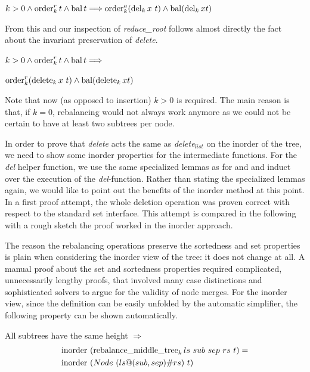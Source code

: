 \begin{lemma}
    $k > 0 \wedge \operatorname{order}^r_k t \wedge \operatorname{bal} t \Longrightarrow
    \operatorname{order}^a_k (\operatorname{del}_k x\ t) \wedge \operatorname{bal} (\operatorname{del}_k x t)$
\end{lemma}

From this and our inspection of \textit{reduce\_root}
follows almost directly the fact about the invariant
preservation of \textit{delete}.

\begin{samepage}
\begin{theorem}
    $k > 0 \wedge \operatorname{order}^r_k t \wedge \operatorname{bal} t \Longrightarrow$ \\
    \begin{center}
    $\operatorname{order}^r_k (\operatorname{delete}_k x\ t) \wedge \operatorname{bal} (\operatorname{delete}_k x t)$
    \end{center}
\end{theorem}
\end{samepage}

Note that now (as opposed to insertion) $k > 0$ is required.
The main reason is that,
if $k = 0$, rebalancing would not always work anymore
as we could not be certain to have at least two subtrees per node.

In order to prove that \textit{delete} acts the same as
\textit{delete}$_{list}$ on the inorder of the tree,
we need to show some inorder properties for the intermediate functions.
For the \textit{del} helper function, 
we use the same specialized lemmas
as for  and 
and induct over the execution of the \textit{del}-function.
Rather than stating the specialized lemmas again, we would like to point
out the benefits of the inorder method at this point.
In a first proof attempt, the whole deletion operation was
proven correct with respect to the standard set interface.
This attempt is compared in the following with a rough sketch
the proof worked in the inorder approach.

The reason the rebalancing operations preserve the sortedness and set properties
is plain when considering the inorder view of the tree:
it does not change at all.
A manual proof about the set and sortedness properties
required complicated, unnecessarily lengthy proofs,
that involved many case distinctions and sophisticated solvers
to argue for the validity of node merges.
For the inorder view, 
since the definition can be easily unfolded
by the automatic simplifier,
the following property can be shown automatically.

\begin{lemma}
    \label{lem:rebalance-inorder}
    All subtrees have the same height $\Longrightarrow$ \\
    \begin{align*}
    \operatorname{inorder}&\ (\operatorname{rebalance\_middle\_tree}_k ls\ sub\ sep\ rs\ t) =\\
    \operatorname{inorder}&\ (Node\ (ls@(sub,sep)\#rs)\ t)
    \end{align*}
\end{lemma}

